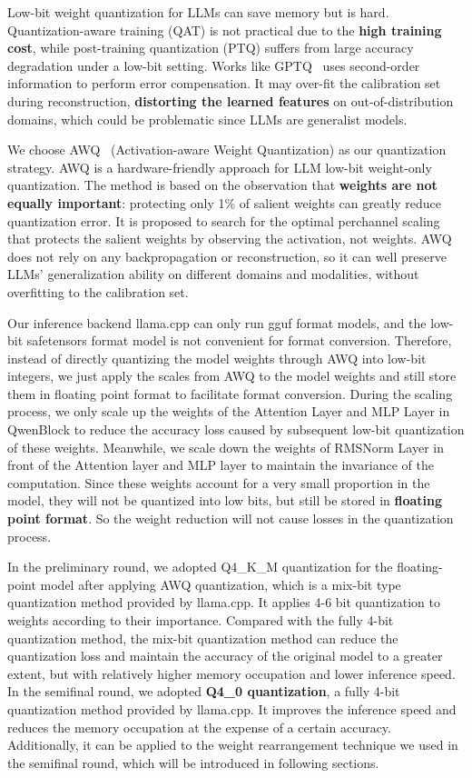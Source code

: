 \documentclass[conference]{IEEEtran}
\begin{document}
Low-bit weight quantization for LLMs can save memory but is hard. Quantization-aware training (QAT) is not practical due to the \textbf{high training cost}, while post-training quantization (PTQ) suffers from large accuracy degradation under a low-bit setting. Works like GPTQ~\cite{frantar-gptq}  uses second-order information to perform error compensation. It may over-fit the calibration set during reconstruction, \textbf{distorting the learned features} on out-of-distribution domains, which could be problematic since LLMs are generalist models.

We choose AWQ~\cite{lin2023awq} (Activation-aware Weight Quantization) as our quantization strategy. AWQ is a hardware-friendly approach for LLM low-bit weight-only quantization. The method is based on the observation that \textbf{weights are not equally important}: protecting only 1\% of salient weights can greatly reduce quantization error. It is proposed to search for the optimal perchannel scaling that protects the salient weights by observing the activation, not weights. AWQ does not rely on any backpropagation or reconstruction, so it can well preserve LLMs’ generalization ability on different domains and modalities, without overfitting to the calibration set.

Our inference backend llama.cpp can only run gguf format models, and the low-bit safetensors format model is not convenient for format conversion. Therefore, instead of directly quantizing the model weights through AWQ into low-bit integers, we just apply the scales from AWQ to the model weights and still store them in floating point format to facilitate format conversion. During the scaling process, we only scale up the weights of the Attention Layer and MLP Layer in QwenBlock to reduce the accuracy loss caused by subsequent low-bit quantization of these weights. Meanwhile, we scale down the weights of RMSNorm Layer in front of the Attention layer and MLP layer to maintain the invariance of the computation. Since these weights account for a very small proportion in the model, they will not be quantized into low bits, but still be stored in \textbf{floating point format}. So the weight reduction will not cause losses in the quantization process.

In the preliminary round, we adopted Q4\_K\_M quantization for the floating-point model after applying AWQ quantization, which is a mix-bit type quantization method provided by llama.cpp. It applies 4-6 bit quantization to weights according to their importance. Compared with the fully 4-bit quantization method, the mix-bit quantization method can reduce the quantization loss and maintain the accuracy of the original model to a greater extent, but with relatively higher memory occupation and lower inference speed. In the semifinal round, we adopted \textbf{Q4\_0 quantization}, a fully 4-bit quantization method provided by llama.cpp. It improves the inference speed and reduces the memory occupation at the expense of a certain accuracy. Additionally, it can be applied to the weight rearrangement technique we used in the semifinal round, which will be introduced in following sections.
\end{document}
